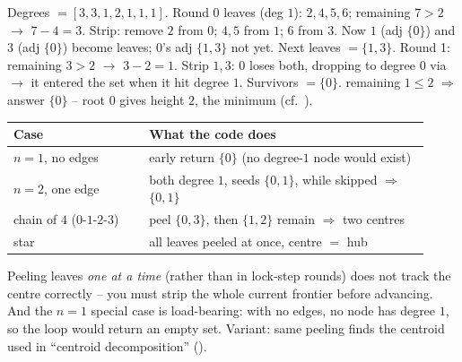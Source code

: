 \begin{tracebox}
Degrees $=[3,3,1,2,1,1,1]$.
Round 0 leaves (deg $1$): $2,4,5,6$; remaining $7>2$ $\to$ $7{-}4=3$.
Strip: remove $2$ from $0$; $4,5$ from $1$; $6$ from $3$. Now $1$ (adj $\{0\}$) and $3$
(adj $\{0\}$) become leaves; $0$'s adj $\{1,3\}$ not yet. Next leaves $=\{1,3\}$.
Round 1: remaining $3>2$ $\to$ $3{-}2=1$. Strip $1,3$: $0$ loses both, dropping to degree
$0$ via $\to$ it entered the set when it hit degree $1$. Survivors $=\{0\}$. remaining $1\le2$
$\Rightarrow$ answer $\{0\}$ -- root $0$ gives height $2$, the minimum (cf.\ ).
\end{tracebox}


\begin{center}\renewcommand{\arraystretch}{1.2}
\begin{tabular}{@{}p{0.30\linewidth} p{0.62\linewidth}@{}}
\toprule
\textbf{Case} & \textbf{What the code does} \\
\midrule
$n=1$, no edges & early return $\{0\}$ (no degree-$1$ node would exist) \\
$n=2$, one edge & both degree $1$, seeds $\{0,1\}$, while skipped $\Rightarrow$ $\{0,1\}$ \\
chain of $4$ ($0\text{-}1\text{-}2\text{-}3$) & peel $\{0,3\}$, then $\{1,2\}$ remain $\Rightarrow$ two centres \\
star & all leaves peeled at once, centre $=$ hub \\
\bottomrule
\end{tabular}\end{center}

\begin{warningbox}
Peeling leaves \emph{one at a time} (rather than in lock-step rounds) does not track the
centre correctly -- you must strip the whole current frontier before advancing. And the
$n=1$ special case is load-bearing: with no edges, no node has degree $1$, so the loop would
return an empty set. Variant: same peeling finds the centroid used in ``centroid
decomposition'' ().
\end{warningbox}

